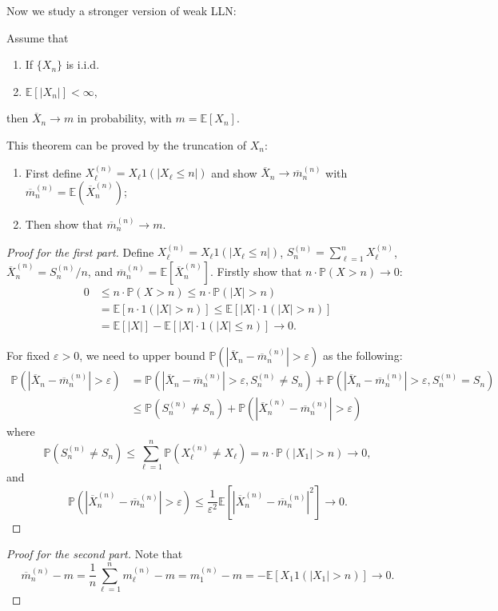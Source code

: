Now we study a stronger version of weak LLN:
\begin{theorem}
Assume that 
\begin{enumerate}
\item
If $\{X_n\}$ is i.i.d.
\item
$\mathbb{E}[|X_n|]<\infty$,
\end{enumerate}
then $\overline{X}_n\to m$ in probability, with $m=\mathbb{E}[X_n]$.
\end{theorem}
This theorem can be proved by the truncation of $X_n$:
\begin{enumerate}
\item
First define $X_{\ell}^{(n)} = X_{\ell}1(|X_{\ell}\le n|)$ and show $\overline{X}_n\to \overline{m}_{n}^{(n)}$ with $\overline{m}_{n}^{(n)}=\mathbb{E}(\overline{X}_{n}^{(n)})$;
\item
Then show that $\overline{m}_{n}^{(n)}\to m$.
\end{enumerate}
\begin{proof}[Proof for the first part]
Define $X_{\ell}^{(n)} = X_{\ell}1(|X_{\ell}\le n|)$,
$S_n^{(n)} = \sum_{\ell=1}^nX_{\ell}^{(n)}$,
$\overline{X}_n^{(n)} = S_n^{(n)}/n$,
and $\overline{m}_{n}^{(n)}=\mathbb{E}[\overline{X}_n^{(n)}]$.
Firstly show that $n\cdot\mathbb{P}(X>n)\to0$:
\begin{align*}
0&\le n\cdot\mathbb{P}(X>n)\le n\cdot\mathbb{P}(|X|>n)\\
&=\mathbb{E}[n\cdot 1(|X|>n)]\le \mathbb{E}[|X|\cdot 1(|X|>n)]\\
&=\mathbb{E}[|X|] - \mathbb{E}[|X|\cdot 1(|X|\le n)]\to0.
\end{align*}

For fixed $\varepsilon>0$, we need to upper bound $\mathbb{P}(|\overline{X}_n- \overline{m}_{n}^{(n)}|>\varepsilon)$ as the following:
\begin{align*}
\mathbb{P}(|\overline{X}_n- \overline{m}_{n}^{(n)}|>\varepsilon)
&=
\mathbb{P}(|\overline{X}_n- \overline{m}_{n}^{(n)}|>\varepsilon, S_n^{(n)}\ne S_n)
+
\mathbb{P}(|\overline{X}_n- \overline{m}_{n}^{(n)}|>\varepsilon, S_n^{(n)}= S_n)\\
&\le \mathbb{P}(S_n^{(n)}\ne S_n) + \mathbb{P}(|\overline{X}_n^{(n)}- \overline{m}_{n}^{(n)}|>\varepsilon)
\end{align*}
where
\[
\mathbb{P}(S_n^{(n)}\ne S_n)\le \sum_{\ell=1}^n\mathbb{P}(X_{\ell}^{(n)}\ne X_{\ell})=n\cdot \mathbb{P}(|X_1|>n)\to0,
\]
and
\[
\mathbb{P}(|\overline{X}_n^{(n)}- \overline{m}_{n}^{(n)}|>\varepsilon)
\le\frac{1}{\varepsilon^2}\mathbb{E}
[|\overline{X}_n^{(n)}- \overline{m}_{n}^{(n)}|^2]\to0.
\]
\end{proof}
\begin{proof}[Proof for the second part]
Note that
\[
\overline{m}^{(n)}_n-m = \frac{1}{n}\sum_{\ell=1}^nm_{\ell}^{(n)}-m
=
m_1^{(n)} - m = -\mathbb{E}[X_1 1(|X_1|>n)]\to0.
\]
\end{proof}









